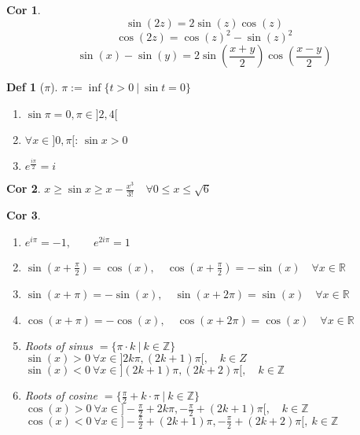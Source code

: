 \documentclass[a4paper, 10pt]{article}
\newtheorem*{corollary}{Cor}
\theoremstyle{definition}
\newtheorem*{definition}{Def}
\theoremstyle{ex}
\theoremstyle{named}
\newcommand{\R}{\mathbb{R}}
\newcommand{\Z}{\mathbb{Z}}
\begin{document}
\begin{corollary}
    $$\sin(2z) = 2 \sin(z)\cos(z)$$
    $$\cos(2z) = \cos(z)^2 - \sin(z)^2$$
    $$\sin(x) - \sin(y) = 2 \sin\left(\frac{x + y}{2}\right)\cos\left(\frac{x - y}{2}\right)$$
\end{corollary}

\begin{definition}[$\pi$]
    $\pi := \inf \{ t > 0 \ | \ \sin t = 0\}$
    \begin{enumerate}[label=(\roman*)]
        \item $\sin \pi = 0, \pi \in ]2, 4[$
        \item $\forall x \in ]0, \pi[$: $\sin x > 0$
        \item $e^{\frac{i \pi}{2}} = i$
    \end{enumerate}
\end{definition}

\begin{corollary}
    $x \geq \sin x \geq x - \frac{x^3}{3!} \quad \forall 0 \leq x \leq \sqrt{6}$
\end{corollary}

\begin{corollary}
    \begin{enumerate}
        \item $e^{i\pi}=-1, \qquad e^{2i\pi}=1$
        \item $\sin(x+\frac{\pi}{2}) = \cos(x), \quad \cos(x+\frac{\pi}{2}) = -\sin(x) \quad \forall x \in \R$
        \item $\sin(x+\pi)=-\sin(x), \quad \sin(x+2\pi) = \sin(x) \quad \forall x \in \R$
        \item $\cos(x+\pi) = -\cos(x), \quad \cos(x+2\pi) = \cos(x) \quad \forall x \in \R$
        \item Roots of sinus $= \{\pi \cdot k \ | \ k \in \Z \}$ \\ 
        $\sin(x) > 0 \ \forall x \in ] 2k \pi, (2k + 1)\pi [, \quad k \in Z$ \\
        $\sin(x) < 0 \ \forall x \in ] (2k + 1)\pi, (2k + 2) \pi [, \quad k \in \Z$
        \item Roots of cosine $= \{\frac{\pi}{2} + k \cdot \pi \ | \ k \in \Z \}$ \\
        $\cos(x) > 0 \ \forall x \in ] - \frac{\pi}{2} + 2k \pi, - \frac{\pi}{2} + (2k + 1)\pi [, \quad k \in \Z$ \\
        $\cos(x) < 0 \ \forall x \in ] -\frac{\pi}{2} + (2k + 1) \pi, - \frac{\pi}{2} + (2k + 2) \pi [, \ k \in \Z$
    \end{enumerate}
\end{corollary}
\end{document}
